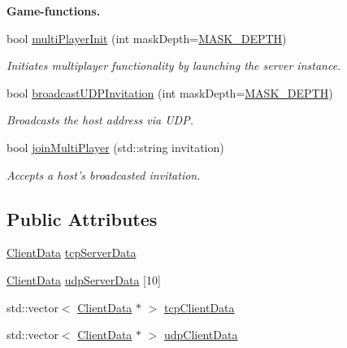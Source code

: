 \begin{Indent}{\bf Game-\/functions.}\par
\begin{DoxyCompactItemize}
\item 
bool \hyperlink{classNetManager_a38ecf3687559726d461bc3ca88377341}{multi\-Player\-Init} (int mask\-Depth=\hyperlink{classNetManager_a8b6ac33bda181fb28896229528cd62b4a1a864782d81ae2d897fa60f33f745cda}{M\-A\-S\-K\-\_\-\-D\-E\-P\-T\-H})
\begin{DoxyCompactList}\small\item\em Initiates multiplayer functionality by launching the server instance. \end{DoxyCompactList}\item 
bool \hyperlink{classNetManager_a3a229856dc69831f0fb80b20c17fbebf}{broadcast\-U\-D\-P\-Invitation} (int mask\-Depth=\hyperlink{classNetManager_a8b6ac33bda181fb28896229528cd62b4a1a864782d81ae2d897fa60f33f745cda}{M\-A\-S\-K\-\_\-\-D\-E\-P\-T\-H})
\begin{DoxyCompactList}\small\item\em Broadcasts the host address via U\-D\-P. \end{DoxyCompactList}\item 
bool \hyperlink{classNetManager_a42ee979c13d39ff6ec2ffbfd7c8f6d2a}{join\-Multi\-Player} (std\-::string invitation)
\begin{DoxyCompactList}\small\item\em Accepts a host's broadcasted invitation. \end{DoxyCompactList}\end{DoxyCompactItemize}
\end{Indent}
\subsection*{Public Attributes}
\begin{DoxyCompactItemize}
\item 
\hyperlink{structClientData}{Client\-Data} \hyperlink{classNetManager_abca113fc17fe6251fa7ac5a1179ade3c}{tcp\-Server\-Data}
\item 
\hyperlink{structClientData}{Client\-Data} \hyperlink{classNetManager_a05e52422c7190259dfb9bbaa6fe7fed5}{udp\-Server\-Data} \mbox{[}10\mbox{]}
\item 
std\-::vector$<$ \hyperlink{structClientData}{Client\-Data} $\ast$ $>$ \hyperlink{classNetManager_a3303746abef87426cab748c92d58006b}{tcp\-Client\-Data}
\item 
std\-::vector$<$ \hyperlink{structClientData}{Client\-Data} $\ast$ $>$ \hyperlink{classNetManager_a687d70a4e199c2cbe4cb955a2cd94b04}{udp\-Client\-Data}
\end{DoxyCompactItemize}
